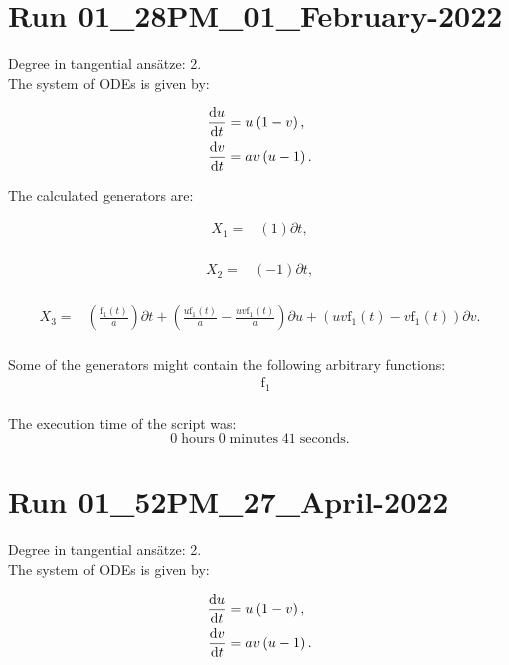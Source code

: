 \section*{Run 01\_28PM\_01\_February-2022}
Degree in tangential ansätze:	2.\\
The system of ODEs is given by:

\begin{align*}
\dv{u}{t}&=u \left(1 - v\right),\\
\dv{v}{t}&=a v \left(u - 1\right).\\
\end{align*}

\noindent The calculated generators are:

\begin{align*}
X_{1}=&\left(1 \right)\partial t,\\
\end{align*}

\begin{align*}
X_{2}=&\left(-1 \right)\partial t,\\
\end{align*}

\begin{align*}
X_{3}=&\left(\frac{\operatorname{f_{1}}{\left(t \right)}}{a} \right)\partial t+\left(\frac{u \operatorname{f_{1}}{\left(t \right)}}{a}- \frac{u v \operatorname{f_{1}}{\left(t \right)}}{a} \right)\partial u+\left(u v \operatorname{f_{1}}{\left(t \right)} - v \operatorname{f_{1}}{\left(t \right)} \right)\partial v.\\
\end{align*}



\noindent Some of the generators might contain the following arbitrary functions:
\begin{align*}
&\operatorname{f_{1}}\\
\end{align*}

\noindent The execution time of the script was:
$$0\;\mathrm{hours}\;0\;\mathrm{minutes}\;41 \;\mathrm{seconds}.$$
\section*{Run 01\_52PM\_27\_April-2022}
Degree in tangential ansätze:	2.\\
The system of ODEs is given by:

\begin{align*}
\dv{u}{t}&=u \left(1 - v\right),\\
\dv{v}{t}&=a v \left(u - 1\right).\\
\end{align*}

